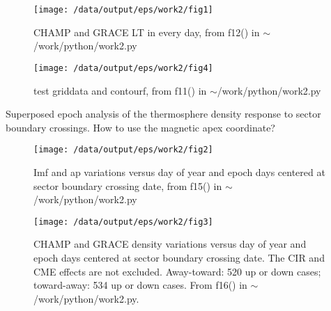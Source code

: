 \documentclass[12pt,a4paper]{article}
\begin{document}
\begin{figure}[!ht]
    \begin{center}
        \texttt{[image: /data/output/eps/work2/fig1]}
        \caption{CHAMP and GRACE LT in every day, from f12() in $\sim$/work/python/work2.py}
    \end{center}
    \label{fig1}
\end{figure}

\begin{figure}[!ht]
    \begin{center}
        \texttt{[image: /data/output/eps/work2/fig4]}
        \caption{test griddata and contourf, from f11() in $\sim$/work/python/work2.py}
    \end{center}
    \label{fig1}
\end{figure}

\newpage
Superposed epoch analysis of the thermosphere density response to sector boundary crossings.
How to use the magnetic apex coordinate?
\begin{figure}[!ht]
    \begin{center}
        \texttt{[image: /data/output/eps/work2/fig2]}
        \caption{Imf and ap variations versus day of year and epoch days centered at sector boundary crossing date, from f15() in $\sim$/work/python/work2.py}
    \end{center}
    \label{fig2}
\end{figure}

\begin{figure}[!ht]
    \begin{center}
        \texttt{[image: /data/output/eps/work2/fig3]}
        \caption{CHAMP and GRACE density variations versus day of year and epoch days centered at sector boundary crossing date. The CIR and CME effects are not excluded. Away-toward: 520 up or down cases; toward-away: 534 up or down cases. From f16() in $\sim$/work/python/work2.py. }
    \end{center}
    \label{fig3}
\end{figure}
\end{document}
